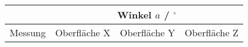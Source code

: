 \begin{tabular}{c|c|c|c}
    \space & \multicolumn{3}{c}{Winkel $a$ / $^\circ$} \\ \hline
    Messung & Oberfläche X & Oberfläche Y & Oberfläche Z \\
\end{tabular}